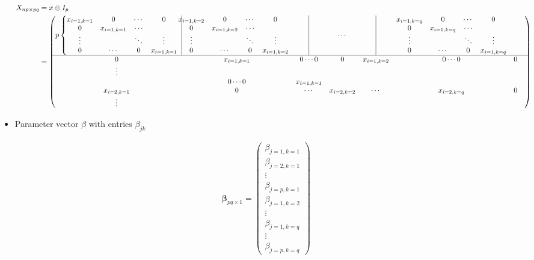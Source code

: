 \documentclass[10pt]{article}
\newcommand{\rvline}{\hspace*{-\arraycolsep}\vline\hspace*{-\arraycolsep}}
\theoremstyle{definition}
\begin{document}
\begin{itemize}
   \begin{align*}
     X_{np \times pq} &= x \otimes I_p\\
     &= \begin{pmatrix}
       p \left\{ \begin{matrix}
        x_{i = 1, k = 1} & 0 & \cdots & 0 \\
        0 & x_{i = 1, k = 1} &  \cdots \\
        \vdots & & \ddots  & \vdots \\
        0 & \cdots & 0 & x_{i = 1, k = 1}
     \end{matrix} \right.
     & \rvline
     \begin{matrix}
      x_{i = 1, k = 2} & 0 & \cdots & 0 \\
      0 & x_{i = 1, k = 2} &  \cdots \\
      \vdots & & \ddots  & \vdots \\
      0 & \cdots & 0 & x_{i = 1, k = 2}
   \end{matrix}
   & \rvline & \cdots  & \rvline & \begin{matrix}
     x_{i = 1, k = q} & 0 & \cdots & 0 \\
     0 & x_{i = 1, k = q} &  \cdots \\
     \vdots & & \ddots  & \vdots \\
     0 & \cdots & 0 & x_{i = 1, k = q}
  \end{matrix}\\
     \hline
    0 & x_{i = 1, k = 1}  & 0 \cdots 0 & 0 &  x_{i = 1, k = 2} & 0 \cdots 0 & 0 & \\
    \vdots \\
    & 0 \cdots 0 & x_{i = 1, k = 1} \\
     x_{i = 2, k = 1} & 0 & \cdots & x_{i = 2, k = 2} & \cdots & x_{i = 2, k = q} & 0 \\
   \vdots  \end{pmatrix}
   \end{align*}


   \item Parameter vector $\beta$ with entries $\beta_{jk}$

   \begin{align*}
     \boldsymbol\beta_{pq \times 1} = \begin{pmatrix}
     \beta_{j = 1, k = 1}\\
     \beta_{j = 2, k = 1} \\\vdots \\
     \beta_{j = p, k = 1} \\
     \beta_{j = 1, k = 2} \\ \vdots \\
     \beta_{j = 1, k = q} \\ \vdots \\
     \beta_{j = p, k = q}
   \end{pmatrix}
   \end{align*}



\end{itemize}
\end{document}
